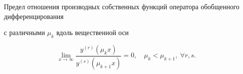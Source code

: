 \smallskip

\hypertarget{napalk:lemma3}{}



\begin{lemma}[3]Предел отношения производных собственных функций оператора обобщенного дифференцирования

с различными $\mu_k$ вдоль вещественной оси 

$$\lim\limits_{x\to \infty}\frac{y^{(r)}(\mu_k

x)}{y^{(s)}(\mu_{k+1} x)}=0, \quad  \mu_k < \mu_{k+1}, \; \forall  r, s.$$

\end{lemma}



\smallskip



